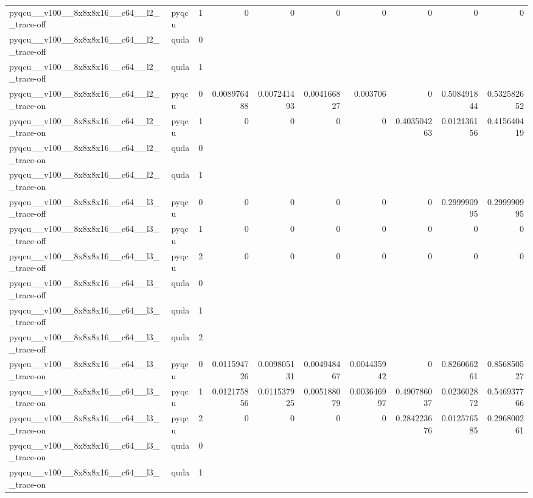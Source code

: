 \begin{table}[htbp]
\begin{tabular}{@{}llrrrrrrrr@{}}
pyqcu\_\_v100\_\_8x8x8x16\_\_c64\_\_l2\_\_trace-off & pyqcu & 1 & 0 & 0 & 0 & 0 & 0 & 0 & 0 \\
pyqcu\_\_v100\_\_8x8x8x16\_\_c64\_\_l2\_\_trace-off & quda & 0 &  &  &  &  &  &  &  \\
pyqcu\_\_v100\_\_8x8x8x16\_\_c64\_\_l2\_\_trace-off & quda & 1 &  &  &  &  &  &  &  \\
pyqcu\_\_v100\_\_8x8x8x16\_\_c64\_\_l2\_\_trace-on & pyqcu & 0 & 0.008976488 & 0.007241493 & 0.004166827 & 0.003706 & 0 & 0.508491844 & 0.532582652 \\
pyqcu\_\_v100\_\_8x8x8x16\_\_c64\_\_l2\_\_trace-on & pyqcu & 1 & 0 & 0 & 0 & 0 & 0.403504263 & 0.012136156 & 0.415640419 \\
pyqcu\_\_v100\_\_8x8x8x16\_\_c64\_\_l2\_\_trace-on & quda & 0 &  &  &  &  &  &  &  \\
pyqcu\_\_v100\_\_8x8x8x16\_\_c64\_\_l2\_\_trace-on & quda & 1 &  &  &  &  &  &  &  \\
pyqcu\_\_v100\_\_8x8x8x16\_\_c64\_\_l3\_\_trace-off & pyqcu & 0 & 0 & 0 & 0 & 0 & 0 & 0.299990995 & 0.299990995 \\
pyqcu\_\_v100\_\_8x8x8x16\_\_c64\_\_l3\_\_trace-off & pyqcu & 1 & 0 & 0 & 0 & 0 & 0 & 0 & 0 \\
pyqcu\_\_v100\_\_8x8x8x16\_\_c64\_\_l3\_\_trace-off & pyqcu & 2 & 0 & 0 & 0 & 0 & 0 & 0 & 0 \\
pyqcu\_\_v100\_\_8x8x8x16\_\_c64\_\_l3\_\_trace-off & quda & 0 &  &  &  &  &  &  &  \\
pyqcu\_\_v100\_\_8x8x8x16\_\_c64\_\_l3\_\_trace-off & quda & 1 &  &  &  &  &  &  &  \\
pyqcu\_\_v100\_\_8x8x8x16\_\_c64\_\_l3\_\_trace-off & quda & 2 &  &  &  &  &  &  &  \\
pyqcu\_\_v100\_\_8x8x8x16\_\_c64\_\_l3\_\_trace-on & pyqcu & 0 & 0.011594726 & 0.009805131 & 0.004948467 & 0.004435942 & 0 & 0.826066261 & 0.856850527 \\
pyqcu\_\_v100\_\_8x8x8x16\_\_c64\_\_l3\_\_trace-on & pyqcu & 1 & 0.012175856 & 0.011537925 & 0.005188079 & 0.003646997 & 0.490786037 & 0.023602872 & 0.546937766 \\
pyqcu\_\_v100\_\_8x8x8x16\_\_c64\_\_l3\_\_trace-on & pyqcu & 2 & 0 & 0 & 0 & 0 & 0.284223676 & 0.012576585 & 0.296800261 \\
pyqcu\_\_v100\_\_8x8x8x16\_\_c64\_\_l3\_\_trace-on & quda & 0 &  &  &  &  &  &  &  \\
pyqcu\_\_v100\_\_8x8x8x16\_\_c64\_\_l3\_\_trace-on & quda & 1 &  &  &  &  &  &  &  \\

\end{tabular}
\end{table}
